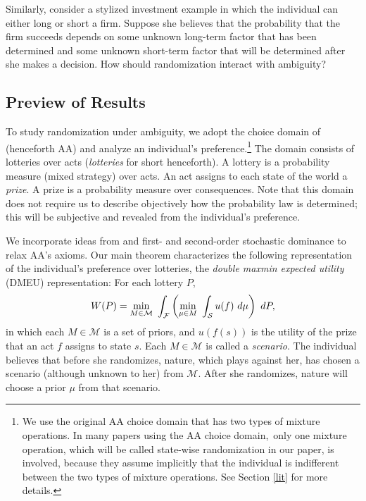 \documentclass[12pt, notitlepage]{article}
\begin{document}
Similarly, consider a stylized investment example in which the individual
can either long or short a firm. Suppose she believes that the probability
that the firm succeeds depends on some unknown long-term factor that has
been determined and some unknown short-term factor that will be determined
after she makes a decision. How should randomization interact with ambiguity?

\subsection{Preview of Results}

To study randomization under ambiguity, we adopt the choice domain of \cite%
{AA63} (henceforth AA) and analyze an individual's preference.\footnote{%
We use the original AA choice domain that has two types of mixture
operations. In many papers using the AA choice domain,\ only one mixture
operation, which will be called state-wise randomization in our paper, is
involved, because they assume implicitly that the individual is indifferent
between the two types of mixture operations. See Section \ref{lit} for more
details.} The domain consists of lotteries over acts (\textit{lotteries} for
short henceforth). A lottery is a probability measure (mixed strategy) over
acts. An act assigns to each state of the world a \textit{prize}. A prize is
a probability measure over consequences. Note that this domain does not
require us to describe objectively how the probability law is determined;
this will be subjective and revealed from the individual's preference.

We incorporate ideas from \cite{GilboaSchmeidler89} and first- and
second-order stochastic dominance to relax AA's axioms. Our main theorem
characterizes the following representation of the individual's preference
over lotteries, the \textit{double maxmin expected utility} (DMEU)
representation: For each lottery $P$,%
\begin{equation*}
W(P)=\min_{M\in \mathcal{M}}~\int_{\mathcal{F}}\left( \underset{\mu \in M}{%
\min }~\int_{\mathcal{S}}u(f)~d\mu \right) ~dP,
\end{equation*}%
in which each $M\in \mathcal{M}$ is a set of priors, and $u(f(s))$ is the
utility of the prize that an act $f$ assigns to state $s$. Each $M\in 
\mathcal{M}$ is called a \textit{scenario}. The individual believes that
before she randomizes, nature, which plays against her, has chosen a
scenario (although unknown to her) from $\mathcal{M}$. After she randomizes,
nature will choose a prior $\mu $ from that scenario.
\end{document}
